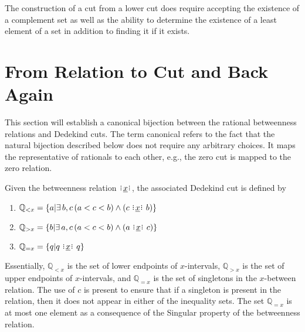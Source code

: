 \documentclass[12pt]{article}
\newcommand{\qcut}[2][x]{\ensuremath{\mathbb{Q}_{#2 #1}}}
\newcommand{\qlt}[1][x]{\qcut[#1]{<}}
\newcommand{\qeq}[1][x]{\qcut[#1]{=}}
\newcommand{\qgt}[1][x]{\qcut[#1]{>}}
\begin{document}
The construction of a cut from a lower cut does require accepting the existence of a complement set as well as the ability to determine the existence of a least element of a set in addition to finding it if it exists. 

\section{From Relation to Cut and Back Again}

This section will establish a canonical bijection between the rational betweenness relations and Dedekind cuts. The term canonical refers to the fact that the natural bijection described below does not require any arbitrary choices. It maps the representative of rationals to each other, e.g., the zero cut is mapped to the zero relation. 

Given the betweenness relation $\xrel$, the associated Dedekind cut is defined by \begin{enumerate}
    \item $\qlt = \{ a | \exists\, b, c \, (a < c < b) \wedge (c \xrel b) \} $
    \item $\qgt = \{ b | \exists\, a, c \, (a < c < b) \wedge (a \xrel c) \} $
    \item $\qeq = \{ q | q \xrel q \} $
\end{enumerate}
Essentially, $\qlt$ is the set of lower endpoints of $x$-intervals, $\mathbb{Q}_{>x}$ is the set of upper endpoints of $x$-intervals, and $\qeq$ is the set of singletons in the $x$-between relation. The use of $c$ is present to ensure that if a singleton is present in the relation, then it does not appear in either of the inequality sets. The set $\qeq$ is at most one element as a consequence of the Singular property of the betweenness relation.
\end{document}
